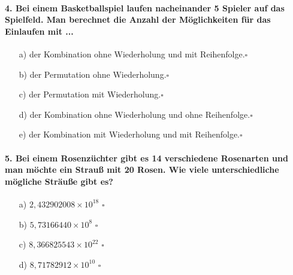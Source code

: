 \documentclass[a4paper]{article}
\begin{document}
\paragraph{4. Bei einem Basketballspiel laufen nacheinander 5 Spieler auf das Spielfeld. Man berechnet die Anzahl der Möglichkeiten für das Einlaufen mit ...}
\begin{itemize}
    \item[a)] der Kombination ohne Wiederholung und mit Reihenfolge.\hfill $\square$
    \item[b)] der Permutation ohne Wiederholung.\hfill $\square$
    \item[c)] der Permutation mit Wiederholung.\hfill $\square$
    \item[d)] der Kombination ohne Wiederholung und ohne Reihenfolge.\hfill $\square$
    \item[e)] der Kombination mit Wiederholung und mit Reihenfolge.\hfill $\square$
\end{itemize}

\paragraph{5. Bei einem Rosenzüchter gibt es 14 verschiedene Rosenarten und man möchte ein Strauß mit 20 Rosen. Wie viele unterschiedliche mögliche Sträuße gibt es?}
\begin{itemize}
    \item[a)] $2,432902008 \times 10^{18}$ \hfill $\square$
    \item[b)] $5,73166440 \times 10^8$ \hfill $\square$
    \item[c)] $8,366825543 \times 10^{22}$ \hfill $\square$
    \item[d)] $8,71782912 \times 10^{10}$ \hfill $\square$
\end{itemize}


\clearpage

\end{document}
